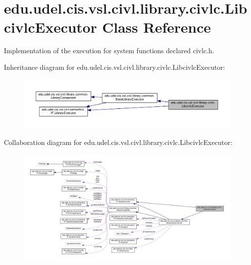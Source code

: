 \hypertarget{classedu_1_1udel_1_1cis_1_1vsl_1_1civl_1_1library_1_1civlc_1_1LibcivlcExecutor}{}\section{edu.\+udel.\+cis.\+vsl.\+civl.\+library.\+civlc.\+Libcivlc\+Executor Class Reference}
\label{classedu_1_1udel_1_1cis_1_1vsl_1_1civl_1_1library_1_1civlc_1_1LibcivlcExecutor}


Implementation of the execution for system functions declared civlc.\+h.  




Inheritance diagram for edu.\+udel.\+cis.\+vsl.\+civl.\+library.\+civlc.\+Libcivlc\+Executor\+:
\nopagebreak
\begin{figure}[H]
\begin{center}
\leavevmode
\includegraphics[width=350pt]{classedu_1_1udel_1_1cis_1_1vsl_1_1civl_1_1library_1_1civlc_1_1LibcivlcExecutor__inherit__graph}
\end{center}
\end{figure}


Collaboration diagram for edu.\+udel.\+cis.\+vsl.\+civl.\+library.\+civlc.\+Libcivlc\+Executor\+:
\nopagebreak
\begin{figure}[H]
\begin{center}
\leavevmode
\includegraphics[width=350pt]{classedu_1_1udel_1_1cis_1_1vsl_1_1civl_1_1library_1_1civlc_1_1LibcivlcExecutor__coll__graph}
\end{center}
\end{figure}

